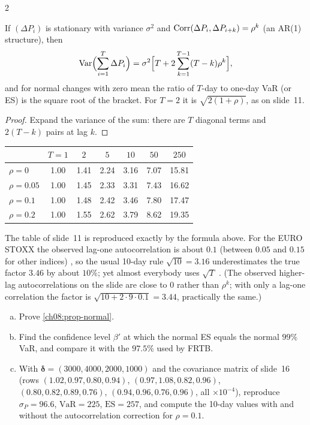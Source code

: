 \begin{paracol}{2}
\begin{proposition}\label{ch08:prop-autocorr}
If $(\Delta P_i)$ is stationary with variance $\sigma^2$ and $\operatorname{Corr}(\Delta P_i,\Delta P_{i+k})=\rho^k$ (an AR(1)
structure), then
\[
  \operatorname{Var}\Bigl(\sum_{i=1}^T\Delta P_i\Bigr)=\sigma^2\Bigl[T+2\sum_{k=1}^{T-1}(T-k)\rho^k\Bigr],
\]
and for normal changes with zero mean the ratio of $T$-day to one-day VaR (or ES) is the square root of the bracket.
For $T=2$ it is $\sqrt{2(1+\rho)}$, as on slide~11.
\end{proposition}
\begin{proof}
Expand the variance of the sum: there are $T$ diagonal terms and $2(T-k)$ pairs at lag $k$.
\end{proof}
\begin{center}\small
\begin{tabular}{@{}lcccccc@{}}
\toprule
 & $T=1$ & $2$ & $5$ & $10$ & $50$ & $250$\\
\midrule
$\rho=0$    & 1.00 & 1.41 & 2.24 & 3.16 & 7.07 & 15.81\\
$\rho=0.05$ & 1.00 & 1.45 & 2.33 & 3.31 & 7.43 & 16.62\\
$\rho=0.1$  & 1.00 & 1.48 & 2.42 & 3.46 & 7.80 & 17.47\\
$\rho=0.2$  & 1.00 & 1.55 & 2.62 & 3.79 & 8.62 & 19.35\\
\bottomrule
\end{tabular}
\end{center}
The table of slide~11 is reproduced exactly by the formula above. For the EURO STOXX the observed lag-one
autocorrelation is about $0.1$ (between $0.05$ and $0.15$ for other indices) , so the usual
10-day rule $\sqrt{10}=3.16$ underestimates the true factor $3.46$ by about $10\%$; yet almost everybody uses
$\sqrt T$ . (The observed higher-lag autocorrelations on the slide are close to $0$ rather than
$\rho^k$; with only a lag-one correlation the factor is $\sqrt{10+2\cdot9\cdot0.1}=3.44$, practically the same.)

\begin{exercise}
\leavevmode
\begin{enumerate}[(a)]
  \item Prove \cref{ch08:prop-normal}.
  \item Find the confidence level $\beta'$ at which the normal ES equals the normal
      $99\%$ VaR, and compare it with the $97.5\%$ used by FRTB.
  \item With $\bm\delta=(3000,4000,2000,1000)$ and the covariance
      matrix of slide~16 (rows $(1.02,0.97,0.80,0.94)$, $(0.97,1.08,0.82,0.96)$, $(0.80,0.82,0.89,0.76)$,
      $(0.94,0.96,0.76,0.96)$, all $\times10^{-4}$), reproduce $\sigma_P=96.6$, $\mathrm{VaR}=225$, $\mathrm{ES}=257$, and
      compute the 10-day values with and without the autocorrelation correction for $\rho=0.1$.
\end{enumerate}
\end{exercise}


\end{paracol}
